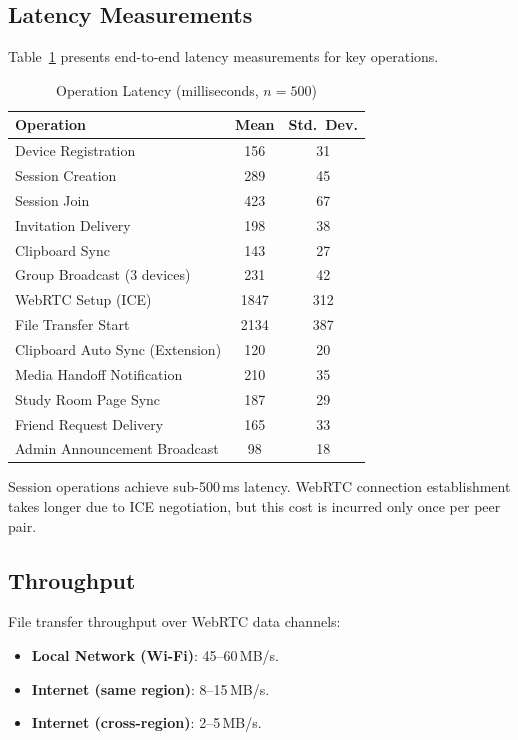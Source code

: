 \documentclass[conference]{IEEEtran}
\begin{document}
\subsection{Latency Measurements}

Table~\ref{tab:latency} presents end-to-end latency measurements for key operations.

\begin{table}[h]
\centering
\caption{Operation Latency (milliseconds, $n=500$)}
\label{tab:latency}
\begin{tabular}{@{}lcc@{}}
\toprule
\textbf{Operation} & \textbf{Mean} & \textbf{Std.\ Dev.} \\ \midrule
Device Registration             & 156  & 31  \\
Session Creation                & 289  & 45  \\
Session Join                    & 423  & 67  \\
Invitation Delivery             & 198  & 38  \\
Clipboard Sync                  & 143  & 27  \\
Group Broadcast (3 devices)     & 231  & 42  \\
WebRTC Setup (ICE)              & 1847 & 312 \\
File Transfer Start             & 2134 & 387 \\
Clipboard Auto Sync (Extension) & 120  & 20  \\
Media Handoff Notification      & 210  & 35  \\
Study Room Page Sync            & 187  & 29  \\
Friend Request Delivery         & 165  & 33  \\
Admin Announcement Broadcast    & 98   & 18  \\ \bottomrule
\end{tabular}
\end{table}

Session operations achieve sub-500\,ms latency. WebRTC connection establishment takes longer due to ICE negotiation, but this cost is incurred only once per peer pair.

\subsection{Throughput}

File transfer throughput over WebRTC data channels:
\begin{itemize}
    \item \textbf{Local Network (Wi-Fi)}: 45--60\,MB/s.
    \item \textbf{Internet (same region)}: 8--15\,MB/s.
    \item \textbf{Internet (cross-region)}: 2--5\,MB/s.
\end{itemize}
\end{document}
